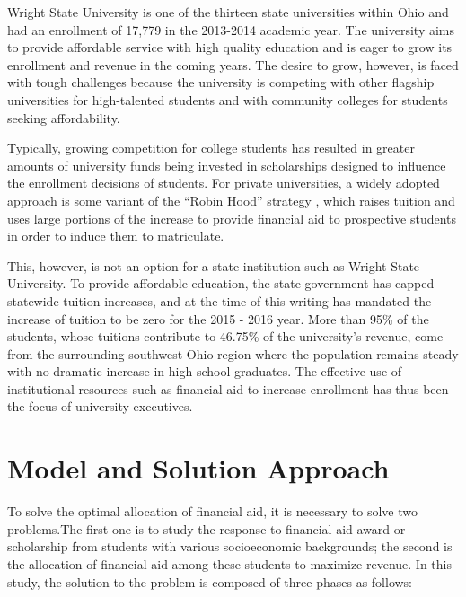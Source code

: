 \documentclass[12pt,english]{report}
\begin{document}
Wright State University is one of the thirteen state universities within Ohio and had an enrollment of 17,779  in the 2013-2014 academic year. The university aims to provide affordable service with high quality education and is eager to grow its enrollment and revenue in the coming years.  The desire to grow, however, is faced with tough challenges because the university is competing with other flagship universities for high-talented students and with community colleges for students seeking affordability.  

Typically, growing competition for college students has resulted in greater amounts of university funds being invested in scholarships designed to influence the enrollment decisions of students. For private universities, a widely adopted approach is some variant of the ``Robin Hood'' strategy \citep{hossler2000role}, which raises tuition and uses large portions of the increase to provide financial aid to prospective  students in order to induce them to matriculate. 

This, however, is not an option for a state institution such as Wright State University. To provide affordable education, the state government has capped statewide tuition increases, and at the time of this writing has mandated the increase of tuition to be zero for the 2015 - 2016 year. More than 95\% of the students, whose tuitions contribute to 46.75\% of the university's revenue, come from the surrounding southwest Ohio region where the population remains steady with no dramatic increase in high school graduates. The effective use of institutional resources such as financial aid to increase enrollment has thus been the focus of university executives. 
 
\section{Model and Solution Approach}
To solve the optimal allocation of financial aid, it is necessary to solve two problems.The first one is to study the response to financial aid award or scholarship from students with various socioeconomic backgrounds; the second is the allocation of financial aid among these students to maximize revenue. In this study, the solution to the problem is composed of three phases as follows:  
\end{document}
